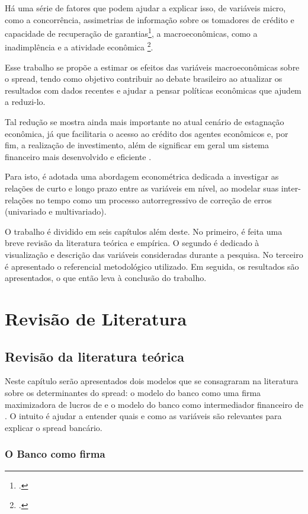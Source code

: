 \documentclass[a4paper,
               article,
               12pt,
               openany,
               oneside,
               english,
               brazil]{abntex2}
\numberwithin{equation}{section}
\begin{document}
    Há uma série de fatores que podem ajudar a explicar isso, de variáveis micro, como a concorrência, assimetrias de informação sobre os tomadores de crédito e capacidade de recuperação de garantias\footcite[13]{reb2018}, a macroeconômicas, como a inadimplência e a atividade econômica \footcite{valor2}.
    
    Esse trabalho se propõe a estimar os efeitos das variáveis macroeconômicas sobre o spread, tendo como objetivo contribuir ao debate brasileiro ao atualizar os resultados com dados recentes e ajudar a pensar políticas econômicas que ajudem a reduzi-lo.
    
    Tal redução se mostra ainda mais importante no atual cenário de estagnação econômica, já que facilitaria o acesso ao crédito dos agentes econômicos e, por fim, a realização de investimento, além de significar em geral um sistema financeiro mais desenvolvido e eficiente \cite[p.~8]{manhica12}.

    Para isto, é adotada uma abordagem econométrica dedicada a investigar as relações de curto e longo prazo entre as variáveis em nível, ao modelar suas inter-relações no tempo como um processo autorregressivo de correção de erros (univariado e multivariado).

    O trabalho é dividido em seis capítulos além deste. No primeiro, é feita uma breve revisão da literatura teórica e empírica. O segundo é dedicado à visualização e descrição das variáveis consideradas durante a pesquisa. No terceiro é apresentado o referencial metodológico utilizado. Em seguida, os resultados são apresentados, o que então leva à conclusão do trabalho.


\section{Revisão de Literatura}
\subsection{Revisão da literatura teórica}

    Neste capítulo serão apresentados dois modelos que se consagraram na literatura sobre os determinantes do spread: o modelo do banco como uma firma maximizadora de lucros de \textcite{klein} e o modelo do banco como intermediador financeiro de \textcite{hoesaunders}. O intuito é ajudar a entender quais e como as variáveis são relevantes para explicar o spread bancário.

\subsubsection{O Banco como firma}
\end{document}
